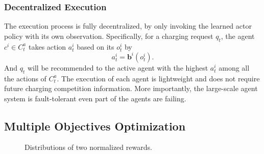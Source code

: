 \documentclass[sigconf]{acmart}
\newcommand{\jia}[1]{{\color{black}{#1}}}
\begin{document}
\subsubsection{\textbf{Decentralized Execution}}\label{sec:execution}
The execution process is fully decentralized, by only invoking the learned actor policy with its own observation.
Specifically, for a charging request $q_t$, the agent $c^i\in C^a_t$ takes action $a^i_t$ based on its $o^i_t$ by
\begin{equation}\label{equ:competition}
a^i_t = \bm{b}^i(o_t^i).
\end{equation}
And $q_t$ will be recommended to the active agent with the highest $a^i_t$ among all the actions of $C^a_t$.
The execution of each agent is lightweight and does not require future charging competition information.
More importantly, the large-scale agent system is fault-tolerant even part of the agents are failing.




\subsection{Multiple Objectives Optimization}\label{sec:objectives}
\begin{figure}[t]
\centering
{}
\caption{Distributions of two normalized rewards.}
\label{fig:reward_dist}
\end{figure} 
\end{document}

